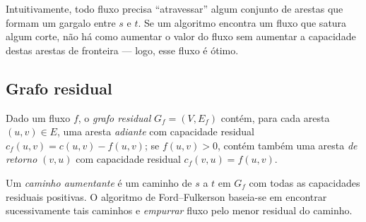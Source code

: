 \noindent Intuitivamente, todo fluxo precisa ``atravessar'' algum conjunto de arestas que formam um gargalo entre $s$ e $t$. Se um algoritmo encontra um fluxo que satura algum corte, não há como aumentar o valor do fluxo sem aumentar a capacidade destas arestas de fronteira — logo, esse fluxo é ótimo.


\subsection{Grafo residual} 

Dado um fluxo $f$, o \emph{grafo residual} $G_f=(V,E_f)$ contém, para cada aresta $(u,v)\in E$, uma aresta \emph{adiante} com capacidade residual $c_f(u,v)=c(u,v)-f(u,v)$; se $f(u,v)>0$, contém também uma aresta \emph{de retorno} $(v,u)$ com capacidade residual $c_f(v,u)=f(u,v)$.

Um \emph{caminho aumentante} é um caminho de $s$ a $t$ em $G_f$ com todas as capacidades residuais positivas. O algoritmo de Ford–Fulkerson baseia-se em encontrar sucessivamente tais caminhos e \emph{empurrar} fluxo pelo menor residual do caminho.